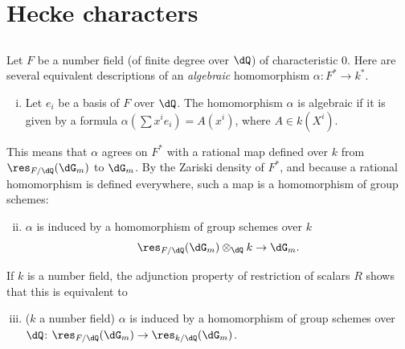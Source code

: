 \section{Hecke characters}\label{VI:5}





\subsection{}\label{VI:5-1}

Let $F$ be a number field (of finite degree over $\dQ$)  of 
characteristic $0$. Here are several equivalent descriptions of an 
\emph{algebraic} homomorphism $\alpha:F^\ast \to k^\ast$. 
\begin{enumerate}[(i)]
  \item Let $e_i$ be a basis of $F$ over $\dQ$. The homomorphism $\alpha$ is 
    algebraic if it is given by a formula 
    $\alpha(\sum x^i e_i) = A(x^i)$, where $A\in k(X^i)$. 
\end{enumerate}

This means that $\alpha$ agrees on $F^\ast$ with a rational map defined over $k$ 
from $\res_{F/\dQ}(\dG_m)$ to $\dG_m$. By the Zariski density of 
$F^\ast$, and because a rational homomorphism is defined everywhere, such 
a map is a homomorphism of group schemes: 
\begin{enumerate}[(i)]
\setcounter{enumi}{1}
  \item $\alpha$ is induced by a homomorphism of group schemes over $k$ 
    \[
      \res_{F/\dQ}(\dG_m)\otimes_\dQ k \to \dG_m \text{.} 
    \] 
\end{enumerate}

If $k$ is a number field, the adjunction property of restriction of 
scalars $R$ shows that this is equivalent to 
\begin{enumerate}[(i)]
\setcounter{enumi}{2}
  \item ($k$ a number field) $\alpha$ is induced by a homomorphism of 
    group schemes over $\dQ$: $\res_{F/\dQ}(\dG_m) \to \res_{k/\dQ}(\dG_m)$. 
\end{enumerate}

